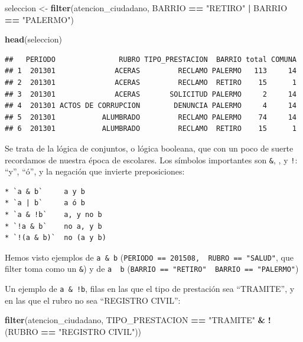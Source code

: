 \documentclass[]{book}
\newenvironment{Shaded}{\begin{snugshade}}{\end{snugshade}}
\newcommand{\KeywordTok}[1]{\textcolor[rgb]{0.13,0.29,0.53}{\textbf{#1}}}
\newcommand{\StringTok}[1]{\textcolor[rgb]{0.31,0.60,0.02}{#1}}
\newcommand{\OperatorTok}[1]{\textcolor[rgb]{0.81,0.36,0.00}{\textbf{#1}}}
\newcommand{\NormalTok}[1]{#1}
\begin{document}
\begin{Shaded}
\begin{Highlighting}[]
\NormalTok{seleccion <-}\StringTok{ }\KeywordTok{filter}\NormalTok{(atencion_ciudadano, BARRIO }\OperatorTok{==}\StringTok{ "RETIRO"} \OperatorTok{|}\StringTok{ }\NormalTok{BARRIO }\OperatorTok{==}\StringTok{ "PALERMO"}\NormalTok{)}

\KeywordTok{head}\NormalTok{(seleccion)}
\end{Highlighting}
\end{Shaded}

\begin{verbatim}
##   PERIODO               RUBRO TIPO_PRESTACION  BARRIO total COMUNA
## 1  201301              ACERAS         RECLAMO PALERMO   113     14
## 2  201301              ACERAS         RECLAMO  RETIRO    15      1
## 3  201301              ACERAS       SOLICITUD PALERMO     2     14
## 4  201301 ACTOS DE CORRUPCION        DENUNCIA PALERMO     4     14
## 5  201301           ALUMBRADO         RECLAMO PALERMO    74     14
## 6  201301           ALUMBRADO         RECLAMO  RETIRO    15      1
\end{verbatim}

Se trata de la lógica de conjuntos, o lógica booleana, que con un poco
de suerte recordamos de nuestra época de escolares. Los símbolos
importantes son \texttt{\&}, \texttt{\textbar{}}, y \texttt{!}: ``y'',
``ó'', y la negación que invierte preposiciones:

\begin{verbatim}
* `a & b`     a y b
* `a | b`     a ó b
* `a & !b`    a, y no b
* `!a & b`    no a, y b
* `!(a & b)`  no (a y b) 
\end{verbatim}

Hemos visto ejemplos de \texttt{a\ \&\ b}
(\texttt{PERIODO\ ==\ 201508,\ \ RUBRO\ ==\ "SALUD"}, que filter toma
como un \texttt{\&}) y de \texttt{a\ \textbar{}\ b}
(\texttt{BARRIO\ ==\ "RETIRO"\ \textbar{}\ BARRIO\ ==\ "PALERMO"})

Un ejemplo de \texttt{a\ \&\ !b}, filas en las que el tipo de prestación
sea ``TRAMITE'', y en las que el rubro no sea ``REGISTRO CIVIL'':

\begin{Shaded}
\begin{Highlighting}[]
\KeywordTok{filter}\NormalTok{(atencion_ciudadano, TIPO_PRESTACION }\OperatorTok{==}\StringTok{ "TRAMITE"} \OperatorTok{&}\StringTok{ }\OperatorTok{!}\NormalTok{(RUBRO }\OperatorTok{==}\StringTok{ "REGISTRO CIVIL"}\NormalTok{))}
\end{Highlighting}
\end{Shaded}
\end{document}
